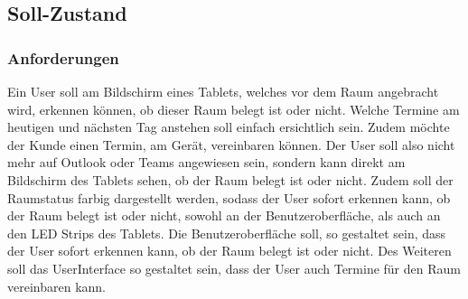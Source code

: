 \pagebreak
\subsection{Soll-Zustand}\label{subsec:soll-zustand}
\subsubsection{Anforderungen}\label{subsubsec:anforderungen}
Ein User soll am Bildschirm eines Tablets, welches vor dem Raum angebracht wird, erkennen können, ob dieser Raum belegt ist oder nicht.
Welche Termine am heutigen und nächsten Tag anstehen soll einfach ersichtlich sein.
Zudem möchte der Kunde einen Termin, am Gerät, vereinbaren können.
Der User soll also nicht mehr auf Outlook oder Teams angewiesen sein, sondern kann direkt am Bildschirm des Tablets sehen, ob der Raum belegt ist oder nicht.
Zudem soll der Raumstatus farbig dargestellt werden, sodass der User sofort erkennen kann, ob der Raum belegt ist oder nicht, sowohl an der Benutzeroberfläche, als auch an den LED Strips des Tablets.
Die Benutzeroberfläche soll, so gestaltet sein, dass der User sofort erkennen kann, ob der Raum belegt ist oder nicht.
Des Weiteren soll das \gls{UserInterface} so gestaltet sein, dass der User auch Termine für den Raum vereinbaren kann.

